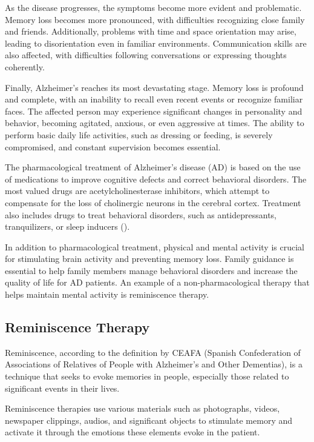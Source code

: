 As the disease progresses, the symptoms become more evident and problematic. Memory loss becomes more pronounced, with difficulties recognizing close family and friends. Additionally, problems with time and space orientation may arise, leading to disorientation even in familiar environments. Communication skills are also affected, with difficulties following conversations or expressing thoughts coherently.

Finally, Alzheimer's reaches its most devastating stage. Memory loss is profound and complete, with an inability to recall even recent events or recognize familiar faces. The affected person may experience significant changes in personality and behavior, becoming agitated, anxious, or even aggressive at times. The ability to perform basic daily life activities, such as dressing or feeding, is severely compromised, and constant supervision becomes essential.

The pharmacological treatment of Alzheimer's disease (AD) is based on the use of medications to improve cognitive defects and correct behavioral disorders. The most valued drugs are acetylcholinesterase inhibitors, which attempt to compensate for the loss of cholinergic neurons in the cerebral cortex. Treatment also includes drugs to treat behavioral disorders, such as antidepressants, tranquilizers, or sleep inducers (\cite{chung2000neurobehavioral}).

In addition to pharmacological treatment, physical and mental activity is crucial for stimulating brain activity and preventing memory loss. Family guidance is essential to help family members manage behavioral disorders and increase the quality of life for AD patients. An example of a non-pharmacological therapy that helps maintain mental activity is reminiscence therapy.

\subsection{Reminiscence Therapy}
Reminiscence, according to the definition by CEAFA (Spanish Confederation of Associations of Relatives of People with Alzheimer's and Other Dementias), is a technique that seeks to evoke memories in people, especially those related to significant events in their lives.

Reminiscence therapies use various materials such as photographs, videos, newspaper clippings, audios, and significant objects to stimulate memory and activate it through the emotions these elements evoke in the patient.

